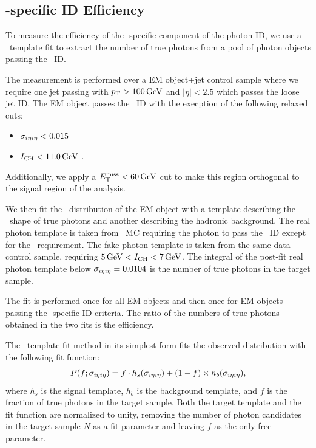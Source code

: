\subsection{\Pgg-specific ID Efficiency}
\label{subsec:pvsf}

To measure the efficiency of the \Pgg-specific component of the photon ID, we use a \sieie\ template fit to extract the number of true photons from a pool of photon objects passing the \egamma\ ID.

The measurement is performed over a EM object+jet control sample where we require one jet passing with $p_{\mathrm{T}} > 100\,\text{Ge\hspace{-.08em}V}$ and $|\eta| < 2.5$ which passes the loose jet ID. 
The EM object passes the \egamma\ ID with the execption of the following relaxed cuts: 
\begin{itemize}
\item $\sigma_{i\eta i\eta} < 0.015$
\item $I_{\text{CH}} < 11.0\,\text{Ge\hspace{-.08em}V}$ .
\end{itemize}
Additionally, we apply a $E_{\mathrm{T}}^{\text{miss}} < 60\,\text{Ge\hspace{-.08em}V}$ cut to make this region orthogonal to the signal region of the analysis.

We then fit the \sieie\ distribution of the EM object with a template describing the \sieie\ shape of true photons and another describing the hadronic background. 
The real photon template is taken from \gj\ MC requiring the photon to pass the \egamma\ ID except for the \sieie\ requirement.
The fake photon template is taken from the same data control sample, requiring $5\,\text{Ge\hspace{-.08em}V} < I_{\text{CH}}
< 7\,\text{Ge\hspace{-.08em}V}$. 
The integral of the post-fit real photon template below $\sigma_{i\eta i\eta} = 0.0104$ is the number of true photons in the target sample.

The fit is performed once for all EM objects and then once for EM objects passing the \Pgg-specific ID criteria. 
The ratio of the numbers of true photons obtained in the two fits is the efficiency.

The \sieie\ template fit method in its simplest form fits the observed distribution with the following fit function:
\begin{align}
  P(f;\sigma_{i\eta i\eta}) = f \cdot h_{s}(\sigma_{i\eta i\eta}) + (1 - f) \times h_{b}(\sigma_{i\eta i\eta}),
\end{align}
where $h_{s}$ is the signal template, $h_{b}$ is the background template, and $f$ is the fraction of true photons in the target sample. 
Both the target template and the fit function are normalized to unity, removing the number of photon candidates in the target sample $N$ as a fit parameter and leaving $f$ as the only free parameter.

